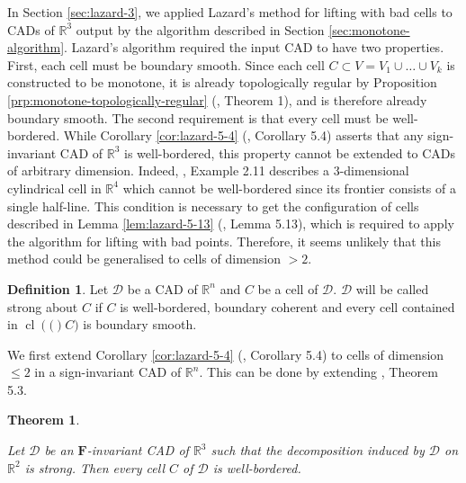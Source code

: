 \documentclass[
]{book}
\newtheorem{theorem}{Theorem}[chapter]
\theoremstyle{definition}
\newtheorem{definition}{Definition}[chapter]
\theoremstyle{definition}
\theoremstyle{definition}
\theoremstyle{definition}
\theoremstyle{remark}
\begin{document}
In Section \ref{sec:lazard-3}, we applied Lazard's method for lifting with bad cells to CADs of \(\mathbb{R}^3\) output by the algorithm described in Section \ref{sec:monotone-algorithm}. Lazard's algorithm required the input CAD to have two properties. First, each cell must be boundary smooth. Since each cell \(C \subset V = V_1\cup \ldots \cup V_k\) is constructed to be monotone, it is already topologically regular by Proposition \ref{prp:monotone-topologically-regular} (\citet{bgv13}, Theorem 1), and is therefore already boundary smooth.
The second requirement is that every cell must be well-bordered. While Corollary \ref{cor:lazard-5-4} (\citet{lazard10}, Corollary 5.4) asserts that any sign-invariant CAD of \(\mathbb{R}^3\) is well-bordered, this property cannot be extended to CADs of arbitrary dimension. Indeed, \citet{lazard10}, Example 2.11 describes a \(3\)-dimensional cylindrical cell in \(\mathbb{R}^4\) which cannot be well-bordered since its frontier consists of a single half-line. This condition is necessary to get the configuration of cells described in Lemma \ref{lem:lazard-5-13} (\citet{lazard10}, Lemma 5.13), which is required to apply the algorithm for lifting with bad points. Therefore, it seems unlikely that this method could be generalised to cells of dimension \(> 2\).

\begin{definition}
\protect\hypertarget{def:strong-about-c}{}\label{def:strong-about-c}Let \(\mathcal{D}\) be a CAD of \(\mathbb{R}^n\) and \(C\) be a cell of \(\mathcal{D}\). \(\mathcal{D}\) will be called strong about \(C\) if \(C\) is well-bordered, boundary coherent and every cell contained in \({\operatorname{cl} \left( ( \right)}C)\) is boundary smooth.
\end{definition}

We first extend Corollary \ref{cor:lazard-5-4} (\citet{lazard10}, Corollary 5.4) to cells of dimension \(\le 2\) in a sign-invariant CAD of \(\mathbb{R}^n\).
This can be done by extending \citet{lazard10}, Theorem 5.3.

\begin{theorem}
\protect\hypertarget{thm:lazard-5-3}{}\label{thm:lazard-5-3}\citep[Theorem 5.3]{lazard10}

Let \(\mathcal{D}\) be an \(\mathbf{F}\)-invariant CAD of \(\mathbb{R}^3\) such that the decomposition induced by \(\mathcal{D}\) on \(\mathbb{R}^2\) is strong. Then every cell \(C\) of \(\mathcal{D}\) is well-bordered.
\end{theorem}
\end{document}
